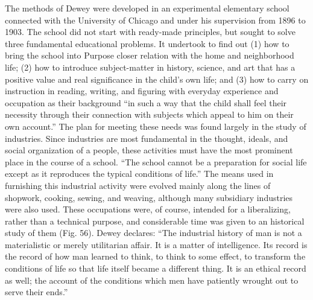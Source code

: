 \documentclass[
]{book}
\begin{document}
The methods of Dewey were developed in an experimental elementary school connected with the University of Chicago and under his supervision from 1896 to 1903. The school did not start with ready-made principles, but sought to solve three fundamental educational problems. It undertook to find out (1) how to bring the school into Purpose closer relation with the home and neighborhood life; (2) how to introduce subject-matter in history, science, and art that has a positive value and real significance in the child's own life; and (3) how to carry on instruction in reading, writing, and figuring with everyday experience and occupation as their background ``in such a way that the child shall feel their necessity through their connection with subjects which appeal to him on their own account.'' The plan for meeting these needs was found largely in the study of industries. Since industries are most fundamental in the thought, ideals, and social organization of a people, these activities must have the most prominent place in the course of a school. ``The school cannot be a preparation for social life except as it reproduces the typical conditions of life.'' The means used in furnishing this industrial activity were evolved mainly along the lines of shopwork, cooking, sewing, and weaving, although many subsidiary industries were also used. These occupations were, of course, intended for a liberalizing, rather than a technical purpose, and considerable time was given to an historical study of them (Fig. 56). Dewey declares: ``The industrial history of man is not a materialistic or merely utilitarian affair. It is a matter of intelligence. Its record is the record of how man learned to think, to think to some effect, to transform the conditions of life so that life itself became a different thing. It is an ethical record as well; the account of the conditions which men have patiently wrought out to serve their ends.''
\end{document}
